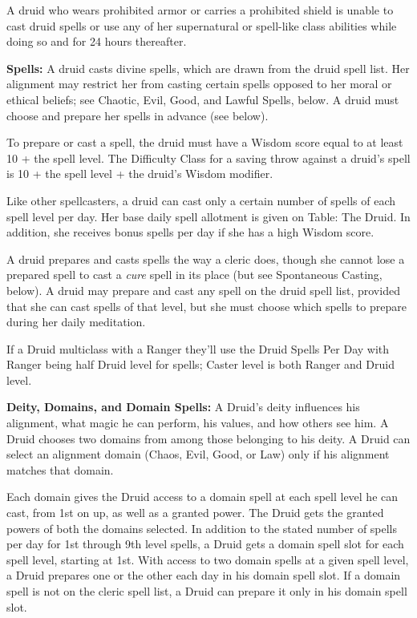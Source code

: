 A druid who wears prohibited armor or carries a prohibited shield is unable to cast druid spells or use any of her supernatural or spell-like class abilities while doing so and for 24 hours thereafter.

\textbf{Spells:} A druid casts divine spells, which are drawn from the druid spell list. Her alignment may restrict her from casting certain spells opposed to her moral or ethical beliefs; see Chaotic, Evil, Good, and Lawful Spells, below. A druid must choose and prepare her spells in advance (see below).

To prepare or cast a spell, the druid must have a Wisdom score equal to at least 10 + the spell level. The Difficulty Class for a saving throw against a druid's spell is 10 + the spell level + the druid's Wisdom modifier.

Like other spellcasters, a druid can cast only a certain number of spells of each spell level per day. Her base daily spell allotment is given on Table: The Druid. In addition, she receives bonus spells per day if she has a high Wisdom score.

A druid prepares and casts spells the way a cleric does, though she cannot lose a prepared spell to cast a \textit{cure} spell in its place (but see Spontaneous Casting, below). A druid may prepare and cast any spell on the druid spell list, provided that she can cast spells of that level, but she must choose which spells to prepare during her daily meditation.

If a Druid multiclass with a Ranger they'll use the Druid Spells Per Day with Ranger being half Druid level for spells; Caster level is both Ranger and Druid level. 

\textbf{Deity, Domains, and Domain Spells:} A Druid's deity influences his alignment, what magic he can perform, his values, and how others see him. A Druid chooses two domains from among those belonging to his deity. A Druid can select an alignment domain (Chaos, Evil, Good, or Law) only if his alignment matches that domain.

Each domain gives the Druid access to a domain spell at each spell level he can cast, from 1st on up, as well as a granted power. The Druid gets the granted powers of both the domains selected. In addition to the stated number of spells per day for 1st through 9th level spells, a Druid gets a domain spell slot for each spell level, starting at 1st. With access to two domain spells at a given spell level, a Druid prepares one or the other each day in his domain spell slot. If a domain spell is not on the cleric spell list, a Druid can prepare it only in his domain spell slot.

